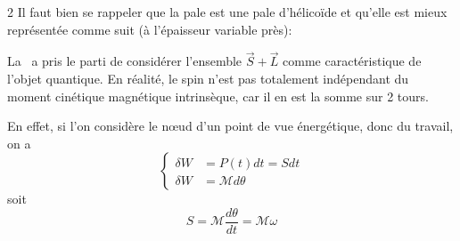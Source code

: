 \begin{multicols}{2}
Il faut bien se rappeler que la pale est une pale d'hélicoïde et qu'elle est mieux représentée comme suit (à l'épaisseur variable près):
\begin{center}
\end{center}

La \MQ\ a pris le parti de considérer l'ensemble $\vec{S}+\vec{L}$ comme caractéristique de l'objet quantique. En réalité, le spin n'est pas totalement indépendant du moment cinétique magnétique intrinsèque, car il en est la somme sur 2 tours.

En effet, si l'on considère le nœud d'un point de vue énergétique, donc du travail, on a
\begin{equation*}
	\left\{
	\begin{split}
		\delta W &= P(t) dt = S dt \\
		\delta W &= \mathcal{M} d\theta
	\end{split}
	\right.
\end{equation*}
soit
\begin{equation*}
	S = \mathcal{M} \frac{d\theta}{dt} = \mathcal{M} \omega
\end{equation*}


\end{multicols}
